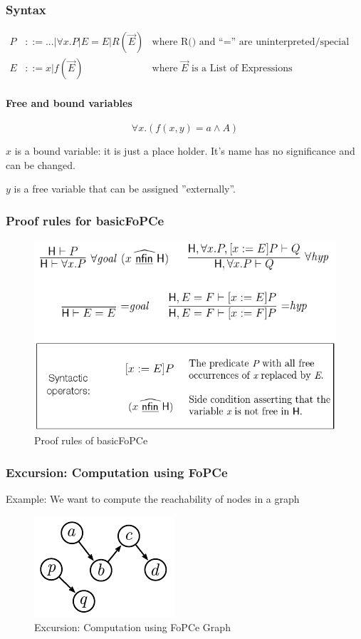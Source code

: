 \subsubsection{Syntax}
\begin{align*}
	P &::= ...| \forall x.P | E = E | R(\vec{E}) 
	& \text{where R() and “=” are uninterpreted/special relationship symbols}\\
	E &::= x | f(\vec{E})
	& \text{where $\vec{E}$ is a List of Expressions}
\end{align*}	

\paragraph{Free and bound variables} \[
	\forall x .(f(x,y) = a \land A)
\]

$x$ is a bound variable: it is just a place holder. It's name has no significance and can be changed.

$y$ is a free variable that can be assigned ''externally''.

\subsubsection{Proof rules for basicFoPCe}
\begin{figure}[H]
\centering
\includegraphics[width=0.7\linewidth]{images/basicfopce_proof_rules}
\caption{Proof rules of basicFoPCe}
\label{fig:basicfopceproofrules}
\end{figure}

\subsubsection{Excursion: Computation using FoPCe}
Example: We want to compute the reachability of nodes in a graph

\begin{figure}[H]
\centering
\includegraphics[width=0.2\linewidth]{images/fopce_graph_excursion}
\caption{Excursion: Computation using FoPCe Graph}
\label{fig:fopcegraphexcursion}
\end{figure}

